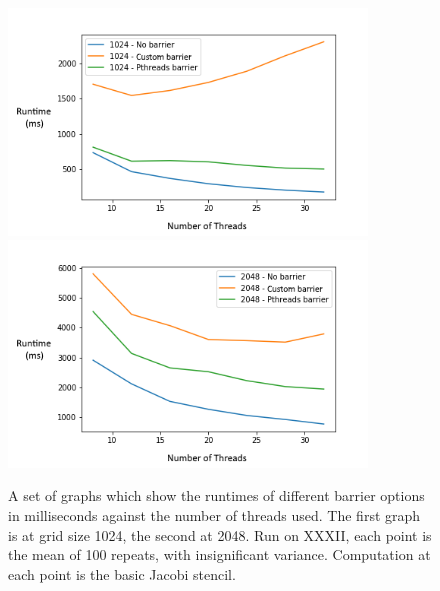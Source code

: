 \begin{figure}[H]
    \begin{center}
        \includegraphics[width=0.85\textwidth]{graphics/performance_characteristics/barrier-1024.png}
        \includegraphics[width=0.85\textwidth]{graphics/performance_characteristics/barrier-2048.png}
    \end{center}
    \caption{A set of graphs which show the runtimes of different barrier options in milliseconds against the number of threads used. The first graph is at grid size 1024, the second at 2048. Run on XXXII, each point is the mean of 100 repeats, with insignificant variance. Computation at each point is the basic Jacobi stencil.}
    \label{fig:barrier_sync}
\end{figure}



